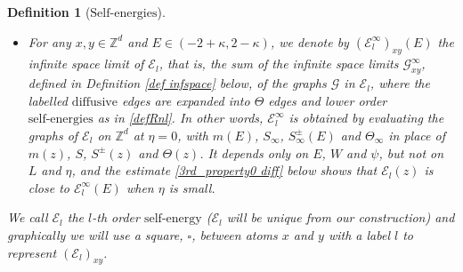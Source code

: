 \documentclass{article}
\newcommand{\1}{\mathds{1}}
\numberwithin{equation}{section}
\newcommand{\be}{\begin{equation}}
\newcommand{\ee}{\end{equation}}
\newcommand{\e}{{\varepsilon}}
\renewcommand{\cal}{\mathcal}
\renewcommand{\leq}{\leqslant}
\renewcommand{\geq}{\geqslant}
\renewcommand{\le}{\leq}
\renewcommand{\ge}{\geq}
\newcommand{\N}{\mathbb{N}}
\newcommand{\Z}{\mathbb{Z}}
\newcommand{\dashed}{\text{diffusive}}
\newcommand{\self}{\text{self-energy}}
\newcommand{\selfs}{\text{self-energies}}
\newcommand{\Selfs}{\text{Self-energies}}
\theoremstyle{plain} %
\newtheorem{definition}[theorem]{Definition}
\theoremstyle{remark}
\newtheorem{remark}[theorem]{Remark}
\newcommand{\Sdelta}{{\Sigma}_T}
\newcommand{\Sinfty}{\Sigma^{\infty}}
\newcommand{\Sele}{{\mathcal E}}
\newcommand{\Selek}{{\mathcal E}}
\newcommand{\Seleinf}{{\mathcal E}^{\infty}}
\begin{document}
\begin{definition}[$\Selfs$]
\begin{itemize}
\item[(iii)]  For any $x,y \in \Z^d$ and $E\in(-2+\kappa,2-\kappa)$, we denote by $(\Seleinf_{l})_{xy}(E)$ the infinite space limit of $\Sele_l$, that is, the sum of the infinite space limits $\cal G^\infty_{xy}$, defined in Definition \ref{def infspace} below, of the graphs $\cal G$ in $\Sele_l$, where the labelled $\dashed$ edges are expanded into $\Theta$ edges and lower order $\selfs$ as in \eqref{defRnl}. In other words, $\Seleinf_l$ is obtained by evaluating the graphs of $\Sele_l$ on $\Z^d$ at $\eta=0$, with $m(E)$, $S_\infty$, $S^\pm_\infty(E)$ and $\Theta_\infty$ in place of $m(z)$, $S$, $S^\pm(z)$ and $\Theta(z)$. It depends only on $E$, $W$ and $\psi$, but not on $L$ and $\eta$, and the estimate \eqref{3rd_property0 diff} below shows that $\Sele_l(z)$ is close to $\Seleinf_l(E)$ when $\eta$ is small.
\end{itemize} 
We call $\Selek_l$ the $l$-th order $\self$ ($\Selek_l$ will be unique from our construction) and graphically 
we will use a square, $\square$, between atoms $x$ and $y$ with a label $l$ to represent $(\Sele_l)_{xy}$. 
\end{definition}
\end{document}

